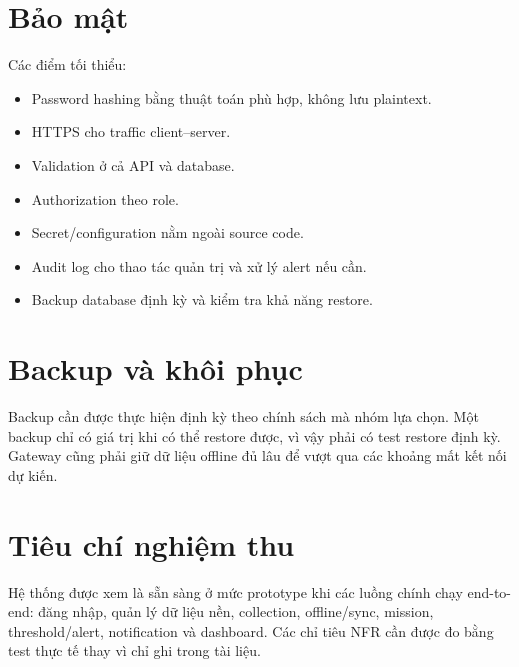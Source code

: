 \section{Bảo mật}
Các điểm tối thiểu:
\begin{itemize}
  \item Password hashing bằng thuật toán phù hợp, không lưu plaintext.
  \item HTTPS cho traffic client--server.
  \item Validation ở cả API và database.
  \item Authorization theo role.
  \item Secret/configuration nằm ngoài source code.
  \item Audit log cho thao tác quản trị và xử lý alert nếu cần.
  \item Backup database định kỳ và kiểm tra khả năng restore.
\end{itemize}

\section{Backup và khôi phục}
Backup cần được thực hiện định kỳ theo chính sách mà nhóm lựa chọn. Một backup chỉ có giá trị khi có thể restore được, vì vậy phải có test restore định kỳ. Gateway cũng phải giữ dữ liệu offline đủ lâu để vượt qua các khoảng mất kết nối dự kiến.

\section{Tiêu chí nghiệm thu}
Hệ thống được xem là sẵn sàng ở mức prototype khi các luồng chính chạy end-to-end: đăng nhập, quản lý dữ liệu nền, collection, offline/sync, mission, threshold/alert, notification và dashboard. Các chỉ tiêu NFR cần được đo bằng test thực tế thay vì chỉ ghi trong tài liệu.
